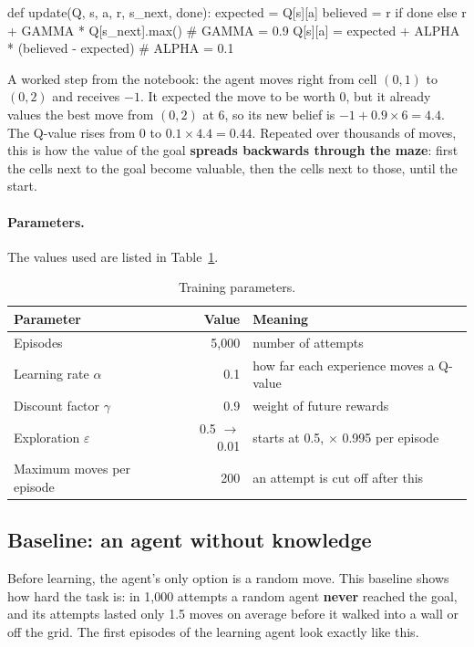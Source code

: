 \documentclass[11pt, a4paper]{article}
\begin{document}
\begin{codeblock}
def update(Q, s, a, r, s_next, done):
    expected = Q[s][a]
    believed = r if done else r + GAMMA * Q[s_next].max()   # GAMMA = 0.9
    Q[s][a] = expected + ALPHA * (believed - expected)        # ALPHA = 0.1
\end{codeblock}

A worked step from the notebook: the agent moves right from cell $(0,1)$ to $(0,2)$ and receives $-1$. It expected the move to be worth 0, but it already values the best move from $(0,2)$ at 6, so its new belief is $-1 + 0.9 \times 6 = 4.4$. The Q-value rises from 0 to $0.1 \times 4.4 = 0.44$. Repeated over thousands of moves, this is how the value of the goal \textbf{spreads backwards through the maze}: first the cells next to the goal become valuable, then the cells next to those, until the start.

\paragraph{Parameters.} The values used are listed in Table~\ref{tab:params}.

\begin{table}[H]
\centering
\small
\caption{Training parameters.}
\label{tab:params}
\begin{tabular}{l r l}
\toprule
Parameter & Value & Meaning \\
\midrule
Episodes & 5,000 & number of attempts \\
Learning rate $\alpha$ & 0.1 & how far each experience moves a Q-value \\
Discount factor $\gamma$ & 0.9 & weight of future rewards \\
Exploration $\varepsilon$ & 0.5 $\rightarrow$ 0.01 & starts at 0.5, $\times$ 0.995 per episode \\
Maximum moves per episode & 200 & an attempt is cut off after this \\
\bottomrule
\end{tabular}
\end{table}

\subsection{Baseline: an agent without knowledge}

Before learning, the agent's only option is a random move. This baseline shows how hard the task is: in 1,000 attempts a random agent \textbf{never} reached the goal, and its attempts lasted only 1.5 moves on average before it walked into a wall or off the grid. The first episodes of the learning agent look exactly like this.
\end{document}
